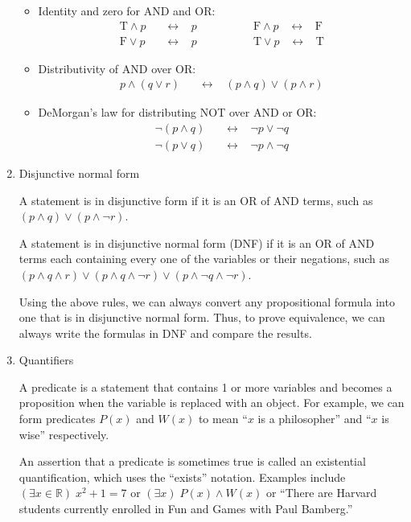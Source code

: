 \documentclass[12pt]{article}
\begin{document}
\begin{enumerate}
\begin{itemize}
	\item Identity and zero for AND and OR: 
	\begin{align*}
		\text{T} \wedge p \;\;\; &\leftrightarrow \;\;\; p \;\;\;\;\;\;\;\;\;\;\;\;\;\;\;\;\;\; \text{F} \wedge p \;\;\; \leftrightarrow \;\;\; \text{F}\\
		\text{F} \vee p \;\;\; &\leftrightarrow \;\;\; p \;\;\;\;\;\;\;\;\;\;\;\;\;\;\;\;\;\; \text{T} \vee p \;\;\; \leftrightarrow \;\;\; \text{T}
	\end{align*}
	
	\item Distributivity of AND over OR:
	\begin{align*}
		p \wedge (q \vee r) \;\;\; &\leftrightarrow \;\;\; (p \wedge q) \vee (p \wedge r)
	\end{align*}
	
	\item DeMorgan's law for distributing NOT over AND or OR:
	\begin{align*}
		\neg (p \wedge q) \;\;\; &\leftrightarrow \;\;\; \neg p \vee \neg q \\
		\neg (p \vee q) \;\;\; &\leftrightarrow \;\;\; \neg p \wedge \neg q
	\end{align*}
\end{itemize}

\item Disjunctive normal form

A statement is in disjunctive form if it is an OR of AND terms, such as $(p \wedge q) \vee (p \wedge \neg r)$.

A statement is in disjunctive normal form (DNF) if it is an OR of AND terms each containing every one of the variables or their negations, such as\\ $(p \wedge q \wedge r) \vee (p \wedge q \wedge \neg r) \vee (p \wedge \neg q \wedge \neg r)$.

Using the above rules, we can always convert any propositional formula into one that is in disjunctive normal form. Thus, to prove equivalence, we can always write the formulas in DNF and compare the results.


\item Quantifiers

A predicate is a statement that contains 1 or more variables and becomes a proposition when the variable is replaced with an object. For example, we can form predicates $P(x)$ and $W(x)$ to mean ``$x$ is a philosopher'' and ``$x$ is wise'' respectively.

An assertion that a predicate is sometimes true is called an existential quantification, which uses the ``exists'' notation. Examples include\\
$(\exists x \in \mathbb{R}) \; x^2 + 1 = 7$ or $(\exists x) \; P(x) \wedge W(x)$ or ``There are Harvard students currently enrolled in Fun and Games with Paul Bamberg.''


\end{enumerate}
\end{document}
